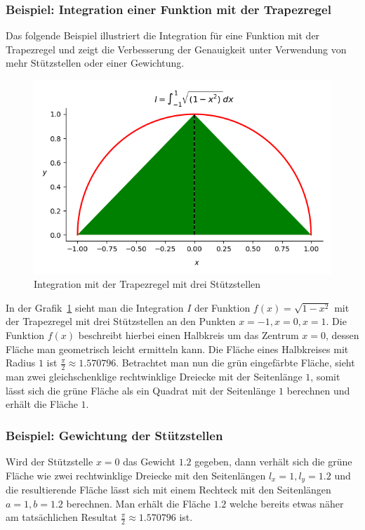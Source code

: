 \subsubsection{Beispiel: Integration einer Funktion mit der Trapezregel}
Das folgende Beispiel illustriert die Integration für eine Funktion mit der Trapezregel und
zeigt die Verbesserung der Genauigkeit unter Verwendung von mehr Stützstellen oder einer Gewichtung.
\begin{figure}
    \centering
    \includegraphics[scale=0.7]{papers/quadratur/figures/GaussTrapez1}
    \caption{Integration mit der Trapezregel mit drei Stützstellen
    \label{quadratur:figure:trapez1}} 
\end{figure}
In der Grafik~\ref{quadratur:figure:trapez1} sieht man die Integration  $I$ der Funktion $f(x) = \sqrt{1-x^{2}}$
mit der Trapezregel mit drei Stützstellen an den Punkten $x=-1, x=0, x=1$.
Die Funktion $f(x)$ beschreibt hierbei einen Halbkreis um das Zentrum $x=0$, 
dessen Fläche man geometrisch leicht ermitteln kann.
Die Fläche eines Halbkreises mit Radius $1$ ist $\frac{\pi}{2} \approx 1.570796$.
Betrachtet man nun die grün eingefärbte Fläche, sieht man zwei gleichschenklige rechtwinklige Dreiecke mit der Seitenlänge $1$,
somit lässt sich die grüne Fläche als ein Quadrat mit der Seitenlänge $1$ berechnen und erhält die Fläche $1$.

\subsubsection{Beispiel: Gewichtung der Stützstellen}
Wird der Stützstelle $x=0$ das Gewicht $1.2$ gegeben, dann verhält sich die grüne Fläche wie zwei rechtwinklige Dreiecke 
mit den Seitenlängen $l_{x}=1, l_{y}=1.2$ und die resultierende Fläche lässt sich mit einem Rechteck mit den Seitenlängen
$a=1, b=1.2$ berechnen.
Man erhält die Fläche $1.2$ welche bereits etwas näher am tatsächlichen Resultat $\frac{\pi}{2} \approx 1.570796$ ist.

